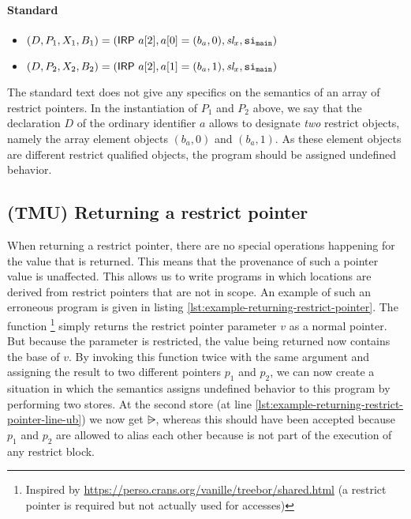 \paragraph{Standard}
\begin{itemize}
    \itemsep0em
    \item $(D, P_1, X_1, B_1) = (\mathsf{IRP} \ a[2], a[0] = (b_a, 0), \textit{sl}_x, \mathtt{si}_\mathtt{main})$
    \item $(D, P_2, X_2, B_2) = (\mathsf{IRP} \ a[2], a[1] = (b_a, 1), \textit{sl}_x, \mathtt{si}_\mathtt{main})$
\end{itemize}

The standard text does not give any specifics on the semantics of an array of restrict pointers.
In the instantiation of $P_1$ and $P_2$ above, we say that the declaration $D$ of the ordinary identifier $a$ 
allows to designate \textit{two} restrict objects, namely the array element objects $(b_a, 0)$ and $(b_a, 1)$.
As these element objects are different restrict qualified objects, the program should be assigned
undefined behavior.


\subsection{(TMU) Returning a restrict pointer}\label{subsec:out-of-scope-bases}
When returning a restrict pointer, there are no special operations happening for the value that is returned.
This means that the provenance of such a pointer value is unaffected.
This allows us to write programs in which locations are derived from 
restrict pointers that are not in scope.
An example of such an erroneous program is given in listing \ref{lst:example-returning-restrict-pointer}.
The function \footnote{Inspired by \url{https://perso.crans.org/vanille/treebor/shared.html} (a restrict pointer is required
but not actually used for accesses)} simply returns the restrict pointer parameter $v$ as a normal pointer. But because the
parameter is restricted, the value being returned now contains the base of $v$. By invoking this function twice with the same argument
and assigning the result to two different pointers $p_1$ and $p_2$, we can now create a situation in which the semantics
assigns undefined behavior to this program by performing two stores. At the second store (at line \ref{lst:example-returning-restrict-pointer-line-ub})
we now get $\rsub$, whereas this should have been accepted because $p_1$ and $p_2$ are allowed to alias each other because  is not part of the execution of any restrict block.

